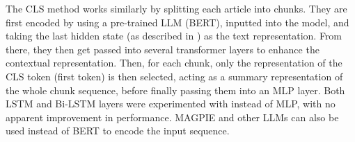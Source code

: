 The CLS method works similarly by splitting each article into chunks. They are first encoded by using a pre-trained LLM (BERT), inputted into the model, and taking the last hidden state (as described in \cite{sun-2020-finetune}) as the text representation. From there, they then get passed into several transformer layers to enhance the contextual representation. Then, for each chunk, only the representation of the CLS token (first token) is then selected, acting as a summary representation of the whole chunk sequence, before finally passing them into an MLP layer. Both LSTM and Bi-LSTM layers were experimented with instead of MLP, with no apparent improvement in performance. MAGPIE and other LLMs can also be used instead of BERT to encode the input sequence.

